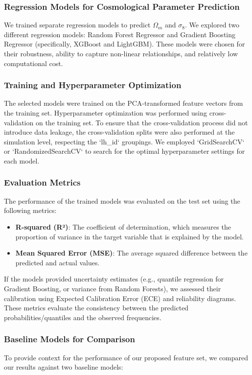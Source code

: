 \documentclass[twocolumn]{aastex631}
\begin{document}
\subsubsection{Regression Models for Cosmological Parameter Prediction}
We trained separate regression models to predict $\Omega_m$ and $\sigma_8$. We explored two different regression models: Random Forest Regressor and Gradient Boosting Regressor (specifically, XGBoost and LightGBM). These models were chosen for their robustness, ability to capture non-linear relationships, and relatively low computational cost.

\subsubsection{Training and Hyperparameter Optimization}
The selected models were trained on the PCA-transformed feature vectors from the training set. Hyperparameter optimization was performed using cross-validation on the training set. To ensure that the cross-validation process did not introduce data leakage, the cross-validation splits were also performed at the simulation level, respecting the `lh_id` groupings. We employed `GridSearchCV` or `RandomizedSearchCV` to search for the optimal hyperparameter settings for each model.

\subsubsection{Evaluation Metrics}
The performance of the trained models was evaluated on the test set using the following metrics:

\begin{itemize}
    \item \textbf{R-squared (R²)}: The coefficient of determination, which measures the proportion of variance in the target variable that is explained by the model.
    \item \textbf{Mean Squared Error (MSE)}: The average squared difference between the predicted and actual values.
\end{itemize}

If the models provided uncertainty estimates (e.g., quantile regression for Gradient Boosting, or variance from Random Forests), we assessed their calibration using Expected Calibration Error (ECE) and reliability diagrams. These metrics evaluate the consistency between the predicted probabilities/quantiles and the observed frequencies.

\subsubsection{Baseline Models for Comparison}
To provide context for the performance of our proposed feature set, we compared our results against two baseline models:
\end{document}
